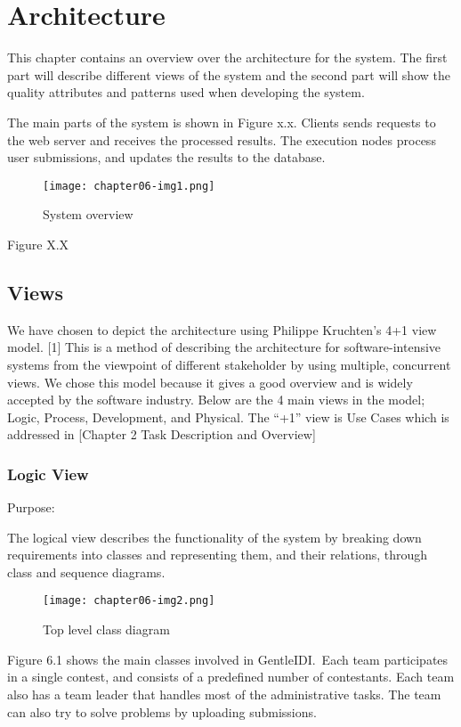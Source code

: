 
\chapter{Architecture}

This chapter contains an overview over the architecture for the system.
The first part will describe different views of the system and the
second part will show the quality attributes and patterns used when
developing the system.




The main parts of the system is shown in Figure x.x. Clients sends
requests to the web server and receives the processed results. The
execution nodes process user submissions, and updates the results to
the database. 
\begin{figure}[t]
 	\texttt{[image: chapter06-img1.png]} 
 	\caption{System overview}
\end{figure}
Figure X.X

\section{Views}

We have chosen to depict the architecture using Philippe
Kruchten's 4+1 view model. [1] This is a method of
describing the architecture for software-intensive systems from the
viewpoint of different stakeholder by using multiple, concurrent views.
We chose this model because it gives a good overview and is widely
accepted by the software industry. Below are the 4 main views in the
model; Logic, Process, Development, and Physical. The
``+1'' view is Use Cases which is
addressed in [Chapter 2 Task Description and Overview]

\subsection{Logic View}

Purpose: 

The logical view describes the functionality of the system by breaking
down requirements into classes and representing them, and their
relations, through class and sequence diagrams.
\begin{figure}[h!]
	\texttt{[image: chapter06-img2.png]} 
	\caption{Top level class diagram}
\end{figure}


Figure 6.1 shows the main classes involved in GentleIDI.\ Each team
participates in a single contest, and consists of a predefined number
of contestants. Each team also has a team leader that handles most of
the administrative tasks. The team can also try to solve problems by
uploading submissions. 



